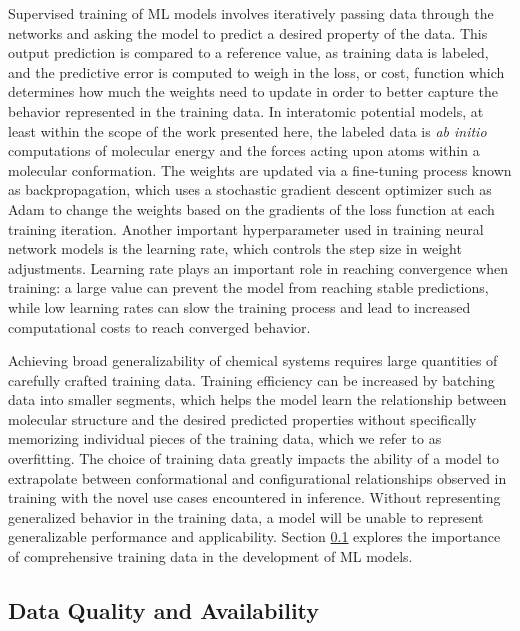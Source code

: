 Supervised training of ML models involves iteratively passing data through the networks and asking the model to predict a desired property of the data.
This output prediction is compared to a reference value, as training data is labeled, and the predictive error is computed to weigh in the loss, or cost, function which determines how much the weights need to update in order to better capture the behavior represented in the training data. 
In interatomic potential models, at least within the scope of the work presented here, the labeled data is \textit{ab initio} computations of molecular energy and the forces acting upon atoms within a molecular conformation.
The weights are updated via a fine-tuning process known as backpropagation, which uses a stochastic gradient descent optimizer such as Adam \cite{adam_optim} to change the weights based on the gradients of the loss function at each training iteration. 
Another important hyperparameter used in training neural network models is the learning rate, which controls the step size in weight adjustments.
Learning rate plays an important role in reaching convergence when training: a large value can prevent the model from reaching stable predictions, while low learning rates can slow the training process and lead to increased computational costs to reach converged behavior.

Achieving broad generalizability of chemical systems requires large quantities of carefully crafted training data.
Training efficiency can be increased by batching data into smaller segments, which helps the model learn the relationship between molecular structure and the desired predicted properties without specifically memorizing individual pieces of the training data, which we refer to as overfitting.
The choice of training data greatly impacts the ability of a model to extrapolate between conformational and configurational relationships observed in training with the novel use cases encountered in inference. 
Without representing generalized behavior in the training data, a model will be unable to represent generalizable performance and applicability.
Section \ref{subsec:Data quality and availability} explores the importance of comprehensive training data in the development of ML models.

\subsection{Data Quality and Availability}
\label{subsec:Data quality and availability}

